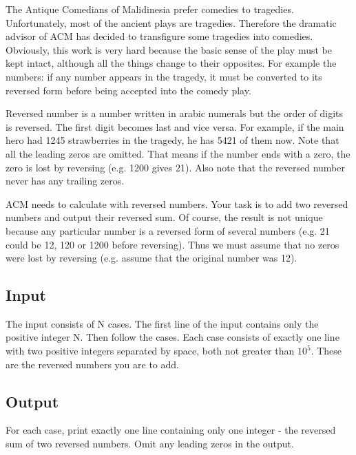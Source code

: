 The Antique Comedians of Malidinesia prefer comedies to tragedies.
Unfortunately, most of the ancient plays are tragedies. Therefore the dramatic
advisor of ACM has decided to transfigure some tragedies into comedies.
Obviously, this work is very hard because the basic sense of the play must be
kept intact, although all the things change to their opposites. For example the
numbers: if any number appears in the tragedy, it must be converted to its
reversed form before being accepted into the comedy play.

Reversed number is a number written in arabic numerals but the order of digits
is reversed. The first digit becomes last and vice versa. For example, if the
main hero had 1245 strawberries in the tragedy, he has 5421 of them now. Note
that all the leading zeros are omitted. That means if the number ends with a
zero, the zero is lost by reversing (e.g. 1200 gives 21). Also note that the
reversed number never has any trailing zeros.

ACM needs to calculate with reversed numbers. Your task is to add two reversed
numbers and output their reversed sum. Of course, the result is not unique
because any particular number is a reversed form of several numbers (e.g. 21
could be 12, 120 or 1200 before reversing). Thus we must assume that no
zeros were lost by reversing (e.g. assume that the original number was 12).

\subsection*{Input}

The input consists of N cases. The first line of the
input contains only the positive integer N. Then follow the cases. Each case
consists of exactly one line with two positive integers separated by space, both
not greater than $10^5$. These are the reversed numbers you are to add.

\subsection*{Output}

For each case, print exactly one line containing only one integer - the reversed
sum of two reversed numbers. Omit any leading zeros in the output.

